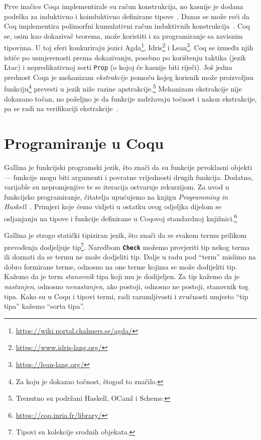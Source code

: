 Prve inačice Coqa implementirale su račun konstrukcija, no kasnije je dodana podrška za induktivno i koinduktivno definirane tipove~\cite{cic, coinductive}.
Danas se može reći da Coq implementira polimorfni kumulativni račun induktivnih konstrukcija~\cite{coqcoqcorrect}.
Coq se, osim kao dokazivač teorema, može koristiti i za programiranje sa zavisnim tipovima.
U toj sferi konkuriraju jezici Agda\footnote{\url{https://wiki.portal.chalmers.se/agda/}}, Idris\footnote{\url{https://www.idris-lang.org/}} i Lean\footnote{\url{https://lean-lang.org/}}. Coq se između njih istiće po usmjerenosti prema dokazivanju, posebno po korištenju taktika (jezik Ltac) i nepredikativnoj sorti \texttt{Prop} (o kojoj će kasnije biti riječi).
Još jedna prednost Coqa je mehanizam \textit{ekstrakcije} pomoću kojeg korisnik može proizvoljnu funkciju\footnote{Za koju je dokazao točnost, štogod to značilo.} prevesti u jezik niže razine apstrakcije.\footnote{Trenutno su podržani Haskell, OCaml i Scheme.}
Mehanizam ekstrakcije nije dokazano točan, no poželjno je da funkcije zadržavaju točnost i nakon ekstrakcije, pa se radi na verifikaciji ekstrakcije~\cite{coqcoqcorrect}.

\section{Programiranje u Coqu}\label{sec:programiranje-u-gallini}
Gallina je funkcijski programski jezik, što znači da su funkcije prvoklasni objekti ---
funkcije mogu biti argumenti i povratne vrijednosti drugih funkcija.
Dodatno, varijable su nepromjenjive  te se iteracija ostvaruje rekurzijom.
Za uvod u funkcijsko programiranje, čitatelja upućujemo na knjigu \textit{Programming in Haskell}~\cite{Hutton_2016}.
Primjeri koje ćemo vidjeti u ostatku ovog odjeljka dijelom se osljanjanju na tipove i funkcije definirane u Coqovoj standardnoj knjižnici.\footnote{\url{https://coq.inria.fr/library/}}

Gallina je strogo statički tipiziran jezik, što znači da se svakom termu prilikom prevođenja dodjeljuje tip\footnote{Tipovi su kolekcije srodnih objekata.}.
Naredbom \texttt{\textbf{Check}} možemo provjeriti tip nekog terma ili doznati da se termu ne može dodjeliti tip.
Dalje u radu pod ``term'' mislimo na dobro formirane terme, odnosno na one terme kojima se može dodijeliti tip.
Kažemo da je term \textit{stanovnik} tipa koji mu je dodijeljen.
Za tip kažemo da je \textit{nastanjen}, odnosno \textit{nenastanjen}, ako postoji, odnosno ne postoji, stanovnik tog tipa.
Kako su u Coqu i tipovi termi, radi razumljivosti i zvučnosti umjesto ``tip tipa'' kažemo ``sorta tipa''.

